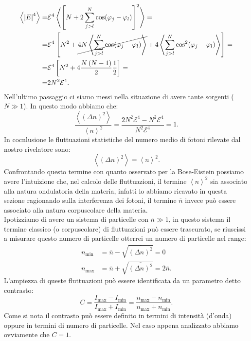 \[\begin{aligned}
	\left<\left| E \right| ^4 \right> 
	=&
	\mathcal{E}^4 
	\left<
	\left[ 
	N + 2 \sum_{j >  l}^{N} \cos( \varphi_j-\varphi_l) 
	\right]^2
	\right> =\\
	=&
	\mathcal{E}^4 
	\left[ 
	N^2 
	+
	\cancel{
	4N
	\left<	
	\sum_{j>l}^{N} \cos( \varphi_j - \varphi_l)  
	\right>
	}
	+
	4 
	\left<
	\sum_{j>l}^{N} \cos^2( \varphi_j-\varphi_l) 
	\right>
	\right]=\\
	=&
	\mathcal{E} ^4 
	\left[ 
	N^2 
	+
	4 \frac{N\left( N-1 \right)}{2} \frac{1}{2} 
	\right] =\\
	=&
	2N^2 \mathcal{E}^4 
.\end{aligned}\]
Nell'ultimo passaggio ci siamo messi nella situazione di avere tante sorgenti ($N\gg 1$).
In questo modo abbiamo che:
\[
	\frac{\left<\left( \Delta n \right) ^2 \right>}{\left< n \right>^2}
	=
	\frac{2N^2\mathcal{E}^4 - N^2\mathcal{E}^4}{N^2\mathcal{E}^4}
	=
	1
.\] 
In cocnlusione le fluttuazioni statistiche del numero medio di fotoni rilevate dal nostro rivelatore sono:
\[
	\left<\left( \Delta n \right)^2 \right> = \left<n \right>^2
.\] 
Confrontando questo termine con quanto osservato per la Bose-Eistein possiamo avere l'intuizione che, nel calcolo delle fluttuazioni, il termine $\left<n \right>^2$ sia associato alla natura ondulatoria della materia, infatti lo abbiamo ricavato in questa sezione ragionando sulla interferenza dei fotoni, il termine $\overline{n}$ invece può essere associato alla natura corpuscolare della materia.\\
Ipotizziamo di avere un sistema di particelle con $\overline{n}\gg 1$, in questo sistema il termine classico (o corpuscolare) di fluttuazioni può essere trascurato, se riuscissi a misurare questo numero di particelle otterrei un numero di particelle nel range:
\[\begin{aligned}
	n_\text{min} &= \overline{n}-\sqrt{\overline{\left( \Delta n \right)^2}} = 0\\
	n_\text{max} &= \overline{n}+\sqrt{\overline{\left( \Delta n \right)^2}} 
	= 2\overline{n}
.\end{aligned}\]
L'ampiezza di queste fluttuazioni può essere identificata da un parametro detto contrasto:
\[
	C = \frac{I_\text{max} - I_\text{min}}{I_\text{max} + I_\text{min}} =
	\frac{n_\text{max} - n_\text{min} }{n_\text{max} + n_\text{min} }
.\] 
Come si nota il contrasto può essere definito in termini di intensità (d'onda) oppure in termini di numero di particelle. Nel caso appena analizzato abbiamo ovviamente che $C=1$.\\
